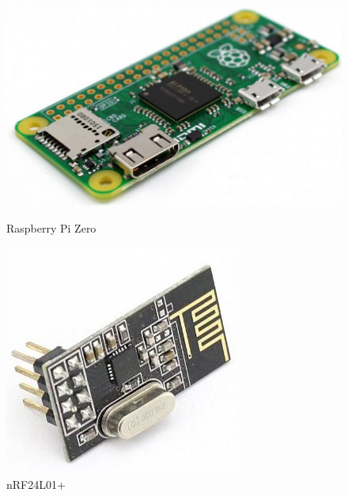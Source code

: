 \begin{figure}[h]
	\centering
	\begin{minipage}[t]{0.3\textwidth}
		\includegraphics[width=\textwidth]{raspberry_zero}
		\caption{Raspberry Pi Zero}
	\end{minipage}
	\hfill
	\begin{minipage}[t]{0.3\textwidth}
		\includegraphics[width=\textwidth]{nrf24l01}
		\caption{nRF24L01+}
	\end{minipage}
	\begin{minipage}[t]{0.3\textwidth}

\end{minipage}
\end{figure}
